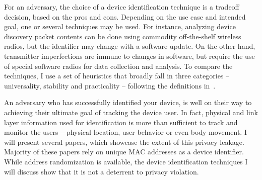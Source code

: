 For an adversary, the choice of a device identification technique is a tradeoff decision, based on the pros and cons. 
%
Depending on the use case and intended goal, one or several techniques may be used. 
%
For instance, analyzing device discovery packet contents can be done using commodity off-the-shelf wireless radios, but the identifier may change with a software update. 
%
On the other hand, transmitter imperfections are immune to changes in software, but require the use of special software radios for data collection and analysis.  
%
To compare the techniques, I use a set of heuristics that broadly fall in three categories -- universality, stability and practicality -- following the definitions in~\cite{csurprivacymetrics}. 

An adversary who has successfully identified your device, is well on their way to achieving their ultimate goal of tracking the device user. 
%
In fact, physical and link layer information used for identification is more than sufficient to track and monitor the users -- physical location, user behavior or even body movement. 
%
I will present several papers, which showcase the extent of this privacy leakage. 
%
Majority of these papers rely on unique MAC addresses as a device identifier. While address randomization is available, the device identification techniques I will discuss show that it is not a deterrent to privacy violation.
%


